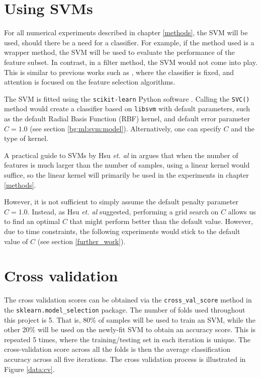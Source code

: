 \documentclass[12pt, twoside, a4paper]{report}
\begin{document}
\section{Using SVMs} \label{data:svms}

For all numerical experiments described in chapter \ref{methods}, the SVM will be used, should there be a need for a classifier. For example, if the method used is a wrapper method, the SVM will be used to evaluate the performance of the feature subset. In contrast, in a filter method, the SVM would not come into play. This is similar to previous works such as \cite{RefWorks:216}, where the classifier is fixed, and attention is focused on the feature selection algorithms.

The SVM is fitted using the \texttt{scikit-learn} Python software \cite{scikit-learn}. Calling the \texttt{SVC()} method would create a classifier based on \texttt{libsvm} \cite{libsvm} with default parameters, such as the default Radial Basis Function (RBF) kernel, and default error parameter $C=1.0$ (see section \ref{bg:ml:svm:model}). Alternatively, one can specify $C$ and the type of kernel.

A practical guide to SVMs by Hsu \textit{et. al} in \cite{RefWorks:128} argues that when the number of features is much larger than the number of samples, using a linear kernel would suffice, so the linear kernel will primarily be used in the experiments in chapter \ref{methods}.


However, it is not sufficient to simply assume the default penalty parameter $C=1.0$. Instead, as Hsu \textit{et. al} suggested, performing a grid search on $C$ allows us to find an optimal $C$ that might perform better than the default value. However, due to time constraints, the following experiments would stick to the default value of $C$ (see section \ref{further_work}).



\section{Cross validation}
The cross validation scores can be obtained via the \texttt{cross\_val\_score} method in the \texttt{sklearn.model\_selection} package. The number of folds used throughout this project is 5. That is, 80\% of samples will be used to train an SVM, while the other 20\% will be used on the newly-fit SVM to obtain an accuracy score. This is repeated 5 times, where the training/testing set in each iteration is unique. The cross-validation score across all the folds is then the average classification accuracy across all five iterations. The cross validation process is illustrated in Figure \ref{data:cv}.
\end{document}

